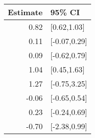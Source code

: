 \begin{tabular}{rl}
  \hline
Estimate & 95\% CI \\ 
  \hline
0.82 & [0.62,1.03] \\ 
  0.11 & [-0.07,0.29] \\ 
  0.09 & [-0.62,0.79] \\ 
  1.04 & [0.45,1.63] \\ 
  1.27 & [-0.75,3.25] \\ 
  -0.06 & [-0.65,0.54] \\ 
  0.23 & [-0.24,0.69] \\ 
  -0.70 & [-2.38,0.99] \\ 
   \hline
\end{tabular}


